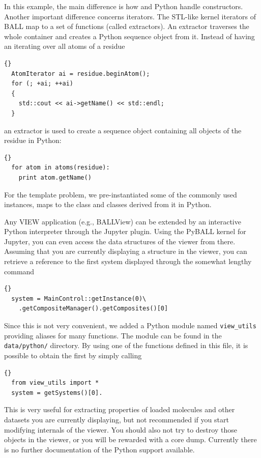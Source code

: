 \noindent
In this example, the main difference is how \CPP and Python handle
constructors. Another important difference concerns iterators. The STL-like
kernel iterators of BALL map to a set of functions (called extractors). An
extractor traverses the whole container and creates a Python sequence object
from it. Instead of having an  iterating over all atoms of
a residue

\begin{lstlisting}{}
  AtomIterator ai = residue.beginAtom();
  for (; +ai; ++ai)
  {
    std::cout << ai->getName() << std::endl;
  }
\end{lstlisting}

\noindent
an  extractor is used to create a sequence object containing
all objects of the residue in Python:

\begin{lstlisting}{}
  for atom in atoms(residue):
    print atom.getName()
\end{lstlisting}

For the template problem, we pre-instantiated some of the 
commonly used instances, \eg {} maps to the 
 class and classes derived from it in Python.

Any VIEW application (e.g., BALLView) can be extended by an interactive Python
interpreter through the Jupyter plugin. Using the PyBALL kernel for Jupyter, 
you can even access the data structures of the viewer from there. Assuming that
you are currently displaying a structure in the viewer, you can retrieve a
reference to the first system displayed through the somewhat lengthy command

\begin{lstlisting}{}
  system = MainControl::getInstance(0)\
    .getCompositeManager().getComposites()[0]
\end{lstlisting}

\noindent
Since this is not very convenient, we added a Python module named \texttt{view\_utils}
providing aliases for many functions. The module can be found in the \texttt{data/python/}
directory. By using one of the functions defined in this file, it is possible to obtain
the first \class{System} by simply calling

\begin{lstlisting}{}
  from view_utils import *
  system = getSystems()[0].
\end{lstlisting}

\noindent
This is very useful for extracting properties of loaded molecules and other 
datasets you are currently displaying, but not recommended if you start 
modifying internals of the viewer. You should also not try to destroy those 
objects in the viewer, or you will be rewarded with a core dump. Currently 
there is no further documentation of the Python support available.
		

